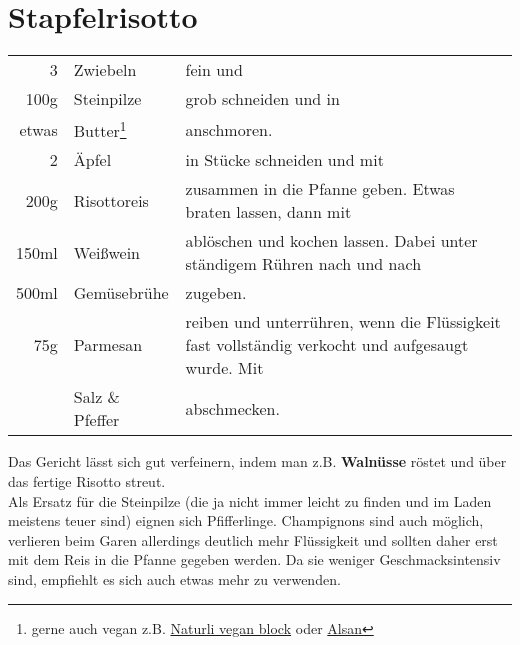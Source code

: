 \section{Stapfelrisotto}
\begin{longtable}{rlL{17,06cm}}
    3       &   Zwiebeln        &   fein und \\
    100g    &   Steinpilze      &   grob schneiden und in  \\
    etwas   &   Butter\footnote{gerne auch vegan z.B. \href{https://www.bio123.de/produkt/naturli/naturli-organic-vegan-block-200g}{Naturli vegan block}
                            oder \href{https://www.alsan.de/alsan-bio/}{Alsan}}
                                &   anschmoren.  \\
    2       &   Äpfel           &   in Stücke schneiden und mit \\
    200g    &   Risottoreis     &   zusammen in die Pfanne geben.
                                    Etwas braten lassen, dann mit   \\
    150ml   &   Weißwein        &   ablöschen und kochen lassen.
                                    Dabei unter ständigem Rühren nach und nach  \\
    500ml   &   Gemüsebrühe     &   zugeben.    \\
    75g     &   Parmesan        &   reiben und unterrühren, wenn die Flüssigkeit fast vollständig verkocht und aufgesaugt wurde.
                                    Mit \\
            &   Salz \& Pfeffer &   abschmecken.\\
\end{longtable}

Das Gericht lässt sich gut verfeinern, indem man z.B. \textbf{Walnüsse} röstet und über das fertige Risotto streut.\\
Als Ersatz für die Steinpilze (die ja nicht immer leicht zu finden und im Laden meistens teuer sind) eignen sich Pfifferlinge.
Champignons sind auch möglich, verlieren beim Garen allerdings deutlich mehr Flüssigkeit und sollten daher erst mit dem Reis in die Pfanne gegeben werden.
Da sie weniger Geschmacksintensiv sind, empfiehlt es sich auch etwas mehr zu verwenden.